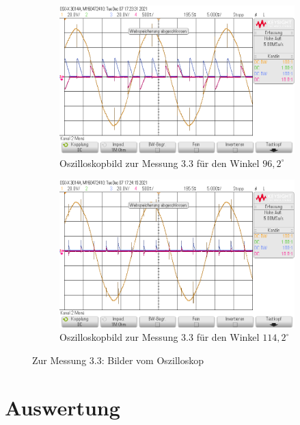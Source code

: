 \documentclass{article}
\begin{document}
\begin{figure}[h]
  \centering
  \begin{subfigure}{.45\textwidth}
    \centering
    \includegraphics[width=\linewidth]{../assets/images/GEP2/32_Winkel962.png}
    \caption{Oszilloskopbild zur Messung 3.3 für den Winkel $96,2^{\circ}$}
  \end{subfigure}
  \begin{subfigure}{.45\textwidth}
    \centering
    \includegraphics[width=\linewidth]{../assets/images/GEP2/32_Winkel1142.png}
    \caption{Oszilloskopbild zur Messung 3.3 für den Winkel $114,2^{\circ}$}
  \end{subfigure}
  \label{fig:31_242}
  \caption{Zur Messung 3.3: Bilder vom Oszilloskop}
\end{figure}


\section{Auswertung}
\end{document}
